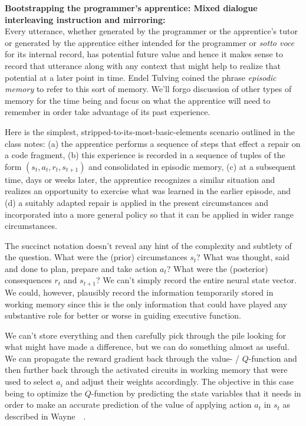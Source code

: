 {\bf{Bootstrapping the programmer's apprentice: Mixed dialogue interleaving instruction and mirroring:}}\\

Every utterance, whether generated by the programmer or the apprentice's tutor or generated by the apprentice either intended for the programmer or {\it{sotto voce}} for its internal record, has potential future value and hence it makes sense to record that utterance along with any context that might help to realize that potential at a later point in time. Endel Tulving coined the phrase {\it{episodic memory}} to refer to this sort of memory. We'll forgo discussion of other types of memory for the time being and focus on what the apprentice will need to remember in order take advantage of its past experience. 

Here is the simplest, stripped-to-its-most-basic-elements scenario outlined in the class notes: (a) the apprentice performs a sequence of steps that effect a repair on a code fragment, (b) this experience is recorded in a sequence of tuples of the form $(s_{t}, a_{t}, r_{t}, s_{t+1})$ and consolidated in episodic memory, (c) at a subsequent time, days or weeks later, the apprentice recognizes a similar situation and realizes an opportunity to exercise what was learned in the earlier episode, and (d) a suitably adapted repair is applied in the present circumstances and incorporated into a more general policy so that it can be applied in wider range circumstances.

The succinct notation doesn't reveal any hint of the complexity and subtlety of the question. What were the (prior) circumstances \emdash{} $s_{t}$? What was thought, said and done to plan, prepare and take action \emdash{} $a_{t}$? What were the (posterior) consequences \emdash{} $r_{t}$ and $s_{t+1}$? We can't simply record the entire neural state vector. We could, however, plausibly record the information temporarily stored in working memory since this is the only information that could have played any substantive role \emdash{} for better or worse \emdash{} in guiding executive function. 

We can't store everything and then carefully pick through the pile looking for what might have made a difference, but we can do something almost as useful. We can propagate the reward gradient back through the value- / $Q$-function and then further back through the activated circuits in working memory that were used to select $a_{i}$ and adjust their weights accordingly. The objective in this case being to optimize the $Q$-function by predicting the state variables that it needs in order to make an accurate prediction of the value of applying action $a_{t}$ in $s_{t}$ as described in Wayne~\etal{}~\cite{WayneetalCoRR-18}.

